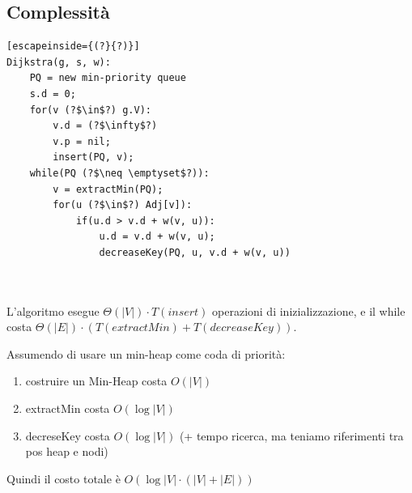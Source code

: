 \documentclass[a4paper,10pt]{article}
\theoremstyle{definition}
\begin{document}
\subsection{Complessità}
\begin{multicols}{2}
 \begin{lstlisting}[escapeinside={(?}{?)}]
Dijkstra(g, s, w):
    PQ = new min-priority queue
    s.d = 0;
    for(v (?$\in$?) g.V):
        v.d = (?$\infty$?)
        v.p = nil;
        insert(PQ, v);
    while(PQ (?$\neq \emptyset$?)):
        v = extractMin(PQ);
        for(u (?$\in$?) Adj[v]):
            if(u.d > v.d + w(v, u)):
                u.d = v.d + w(v, u);
                decreaseKey(PQ, u, v.d + w(v, u))
    
    
 \end{lstlisting}
L'algoritmo esegue $\Theta(|V|)\cdot T(insert)$ operazioni di inizializzazione, e il while costa $\Theta(|E|)\cdot (T(extractMin) + T(decreaseKey))$.

Assumendo di usare un min-heap come coda di priorità:

\begin{enumerate}
 \item costruire un Min-Heap costa $O(|V|)$
 \item extractMin costa $O(\log |V|)$
 \item decreseKey costa $O(\log |V|)$ (+ tempo ricerca, ma teniamo riferimenti tra pos heap e nodi)
\end{enumerate}
Quindi il costo totale è $O(\log |V| \cdot(|V| + |E|))$
\end{multicols}


\newpage
\end{document}
